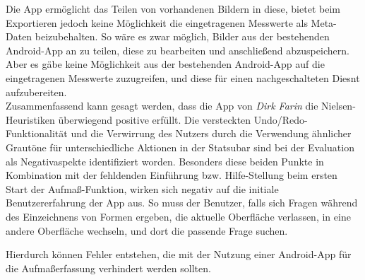 Die App ermöglicht das Teilen von vorhandenen Bildern in diese, bietet beim Exportieren jedoch keine Möglichkeit die eingetragenen Messwerte als Meta-Daten beizubehalten.
So wäre es zwar möglich, Bilder aus der bestehenden Android-App an \im{} zu teilen, diese zu bearbeiten und anschließend abzuspeichern. 
Aber es gäbe keine Möglichkeit aus der bestehenden Android-App auf die eingetragenen Messwerte zuzugreifen, und diese für einen nachgeschalteten Diesnt aufzubereiten. \\

Zusammenfassend kann gesagt werden, dass die App \im{} von \emph{Dirk Farin} die Nielsen-Heuristiken überwiegend positive erfüllt.
Die versteckten Undo/Redo-Funktionalität und die Verwirrung des Nutzers durch die Verwendung ähnlicher Grautöne für unterschiedliche Aktionen in der Statsubar sind bei der Evaluation als Negativaspekte identifiziert worden.
Besonders diese beiden Punkte in Kombination mit der fehldenden Einführung bzw. Hilfe-Stellung beim ersten Start der Aufmaß-Funktion, wirken sich negativ auf die initiale Benutzererfahrung der App aus.
So muss der Benutzer, falls sich Fragen während des Einzeichnens von Formen ergeben, die aktuelle Oberfläche verlassen, in eine andere Oberfläche wechseln, und dort die passende Frage suchen. 

Hierdurch können Fehler entstehen, die mit der Nutzung einer Android-App für die Aufmaßerfassung verhindert werden sollten.
